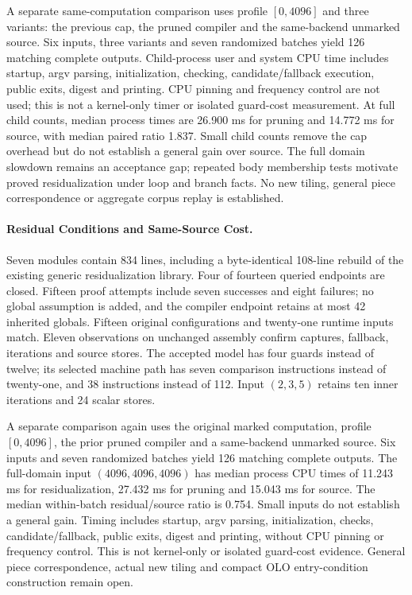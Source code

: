 A separate same-computation comparison uses profile $[0,4096]$ and three
variants: the previous cap, the pruned compiler and the same-backend unmarked
source. Six inputs, three variants and seven randomized batches yield 126
matching complete outputs. Child-process user and system CPU time includes
startup, argv parsing, initialization, checking, candidate/fallback execution,
public exits, digest and printing. CPU pinning and frequency control are not
used; this is not a kernel-only timer or isolated guard-cost measurement.
At full child counts, median process times are 26.900 ms for pruning and
14.772 ms for source, with median paired ratio 1.837. Small child counts remove
the cap overhead but do not establish a general gain over source. The full
domain slowdown remains an acceptance gap; repeated body membership tests
motivate proved residualization under loop and branch facts. No new tiling,
general piece correspondence or aggregate corpus replay is established.


\paragraph{Residual Conditions and Same-Source Cost.}
Seven modules contain 834 lines, including a byte-identical 108-line rebuild
of the existing generic residualization library. Four of fourteen queried
endpoints are closed. Fifteen proof attempts include seven successes and
eight failures; no global assumption is added, and the compiler endpoint
retains at most 42 inherited globals. Fifteen original configurations and
twenty-one runtime inputs match. Eleven observations on unchanged assembly
confirm captures, fallback, iterations and source stores. The accepted model
has four guards instead of twelve; its selected machine path has seven
comparison instructions instead of twenty-one, and 38 instructions instead
of 112. Input $(2,3,5)$ retains ten inner iterations and 24 scalar stores.

A separate comparison again uses the original marked computation, profile
$[0,4096]$, the prior pruned compiler and a same-backend unmarked source.
Six inputs and seven randomized batches yield 126 matching complete outputs.
The full-domain input $(4096,4096,4096)$ has median process CPU times of
11.243 ms for residualization, 27.432 ms for pruning and 15.043 ms for source.
The median within-batch residual/source ratio is 0.754. Small inputs do not
establish a general gain. Timing includes startup, argv parsing, initialization,
checks, candidate/fallback, public exits, digest and printing, without CPU
pinning or frequency control. This is not kernel-only or isolated guard-cost
evidence. General piece correspondence, actual new tiling and compact OLO
entry-condition construction remain open.

